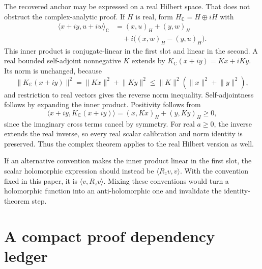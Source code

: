 \documentclass[11pt,a4paper]{article}
\numberwithin{equation}{section}
\theoremstyle{definition}
\theoremstyle{remark}
\newcommand{\C}{\mathbb C}
\newcommand{\ip}[2]{\langle #1,#2\rangle}
\newcommand{\norm}[1]{\lVert #1\rVert}
\begin{document}
The recovered anchor may be expressed on a real Hilbert space.
That does not obstruct the complex-analytic proof. If $H$ is real,
form $H_\C=H\oplus iH$ with
\begin{align*}
\ip{x+iy}{u+iw}_{\C}
&=(x,u)_H+(y,w)_H\\
&\quad+i\bigl((x,w)_H-(y,u)_H\bigr).
\end{align*}
This inner product is conjugate-linear in the first slot and linear
in the second. A real bounded self-adjoint nonnegative $K$ extends
by $K_\C(x+iy)=Kx+iKy$. Its norm is unchanged, because
\[
\norm{K_\C(x+iy)}^2=\norm{Kx}^2+\norm{Ky}^2
\leq\norm K^2(\norm x^2+\norm y^2),
\]
and restriction to real vectors gives the reverse norm inequality.
Self-adjointness follows by expanding the inner product. Positivity
follows from
\[
\ip{x+iy}{K_\C(x+iy)}=(x,Kx)_H+(y,Ky)_H\geq0,
\]
since the imaginary cross terms cancel by symmetry.
For real $a\geq0$, the inverse extends the real inverse, so every
real scalar calibration and norm identity is preserved. Thus the
complex theorem applies to the real Hilbert version as well.

If an alternative convention makes the inner product linear in the
first slot, the scalar holomorphic expression should instead be
$\ip{R_zv}{v}$. With the convention fixed in this paper, it is
$\ip v{R_zv}$. Mixing these conventions would turn a holomorphic
function into an anti-holomorphic one and invalidate the identity-theorem
step.

\section[Proof dependencies]{A compact proof dependency ledger}\label{app:ledger}
\end{document}
